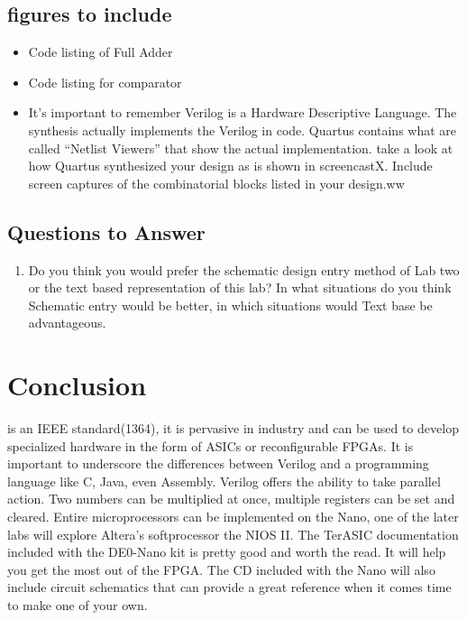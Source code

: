     \subsection{figures to include}
    \begin{itemize}
      \item Code listing of Full Adder
      \item Code listing for comparator
      \item It's important to remember Verilog is a Hardware Descriptive Language. The synthesis actually implements the Verilog in code. Quartus contains what are called ``Netlist Viewers'' that show the actual implementation. take a look at how Quartus synthesized your design as is shown in screencastX. Include screen captures of the combinatorial blocks listed in your design.ww
    \end{itemize}

    \subsection{Questions to Answer}
      \begin{enumerate}
        \item Do you think you would prefer the schematic design entry method of Lab two or the text based representation of this lab? In what situations do you think Schematic entry would be better, in which situations would Text base be advantageous.
      \end{enumerate}

  \section{Conclusion}
     is an IEEE standard(1364)\cite{Wikipedia:Verilog}, it is pervasive in industry and can be used to develop specialized hardware in the form of ASICs or reconfigurable FPGAs. It is important to underscore the differences between Verilog and a programming language like C, Java, even Assembly. Verilog offers the ability to take parallel action. Two numbers can be multiplied at once, multiple registers can be set and cleared. Entire microprocessors can be implemented on the Nano, one of the later labs will explore Altera's softprocessor the NIOS II. The TerASIC documentation included with the DE0-Nano kit is pretty good and worth the read. It will help you get the most out of the FPGA. The CD included with the Nano will also include circuit schematics that can provide a great reference when it comes time to make one of your own.

  

